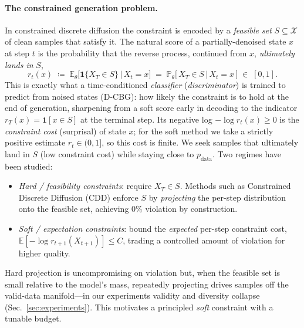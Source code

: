 \documentclass{article}
\newcommand{\E}{\mathbb{E}}
\newcommand{\X}{\mathcal{X}}
\begin{document}
\paragraph{The constrained generation problem.} In constrained discrete diffusion the constraint is encoded by a \emph{feasible set} $S\subseteq\X$ of clean samples that satisfy it. The natural score of a partially-denoised state $x$ at step $t$ is the probability that the reverse process, continued from $x$, \emph{ultimately lands in} $S$,
\begin{equation}
\label{eq:rscore}
r_t(x)\;\coloneqq\;\E_\theta\!\big[\mathbf 1\{X_T\in S\}\,\big|\,X_t=x\big]
\;=\;\mathbb P_\theta\!\big[\,X_T\in S \,\big|\, X_t=x\,\big]\;\in\;[0,1].
\end{equation}
This is exactly what a time-conditioned \emph{classifier} (\emph{discriminator}) is trained to predict from noised states (D-CBG): how likely the constraint is to hold at the end of generation, sharpening from a soft score early in decoding to the indicator $r_T(x)=\mathbf 1[x\in S]$ at the terminal step. Its negative log $-\log r_t(x)\ge0$ is the \emph{constraint cost} (surprisal) of state $x$; for the soft method we take a strictly positive estimate $r_t\in(0,1]$, so this cost is finite. We seek samples that ultimately land in $S$ (low constraint cost) while staying close to $p_{\mathrm{data}}$. Two regimes have been studied:
\begin{itemize}
\item \emph{Hard / feasibility constraints}: require $X_T\in S$. Methods such as Constrained Discrete Diffusion (CDD) \cite{cardei2025cdd} enforce $S$ by \emph{projecting} the per-step distribution onto the feasible set, achieving $0\%$ violation by construction.
\item \emph{Soft / expectation constraints}: bound the \emph{expected} per-step constraint cost, $\E[-\log r_{t+1}(X_{t+1})]\le C$, trading a controlled amount of violation for higher quality.
\end{itemize}
Hard projection is uncompromising on violation but, when the feasible set is small relative to the model's mass, repeatedly projecting drives samples off the valid-data manifold---in our experiments validity and diversity collapse (Sec.~\ref{sec:experiments}). This motivates a principled \emph{soft} constraint with a tunable budget.
\end{document}
